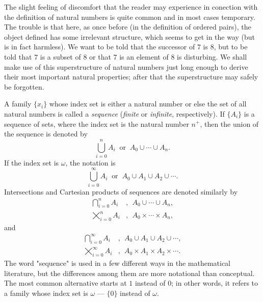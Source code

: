 The slight feeling of discomfort that the reader may experience in conection with the definition of natural numbers is quite common and in most cases temporary. The trouble is that here, as once before (in the definition of ordered pairs), the object defined has some irrelevant structure, which seems to get in the way (but is in fact harmless). We want to be told that the successor of $7$ is $8$, but to be told that $7$ is a subset of $8$ or that $7$ is an element of $8$ is disturbing. We shall make use of this superstructure of natural numbers just long enough to derive their most important natural properties; after that the superstructure may safely be forgotten.

A family $ \{ x_{i} \} $ whose index set is either a natural number or else the set of all natural numbers is called a \textit{sequence} (\textit{finite} or \textit{infinite}, respectively). If $\{ A_{i} \}$ is a sequence of sets, where the index set is the natural number $n^{+}$, then the union of the sequence is denoted by
\begin{equation*}
\bigcup_{i = 0}^{n} A_{i} \: \text{ or } \: A_{0}\cup \cdots \cup A_{n}.
\end{equation*}
If the index set is $ \omega $, the notation is 
\begin{equation*}
\bigcup_{i = 0}^{\infty} A_{i} \: \text{ or } \: A_{0} \cup A_{1} \cup A_{2} \cup \cdots .
\end{equation*}
Intersections and Cartesian products of sequences are denoted similarly by
\begin{align*}
\bigcap_{i = 0}^{n} A_{i} &, \: \: A_{0}\cup \cdots \cup A_{n}, \\
\bigtimes_{i = 0}^{n} A_{i} &, \: \: A_{0}\times \cdots \times A_{n},
\end{align*}
and
\begin{align*}
\bigcap_{i = 0}^{\infty} A_{i} &, \: \: A_{0} \cup A_{1} \cup A_{2} \cup \cdots , \\
\bigtimes_{i = 0}^{\infty} A_{i} &, \:  \: A_{0} \times A_{1} \times A_{2} \times \cdots .
\end{align*}
The word "sequence" is used in a few different ways in the mathematical literature, but the differences among them are more notational than conceptual. The most common alternative starts at $1$ instead of $0$; in other words, it refers to a family whose index set is $ \omega $ — $\{ 0 \}$ instead of $ \omega $.